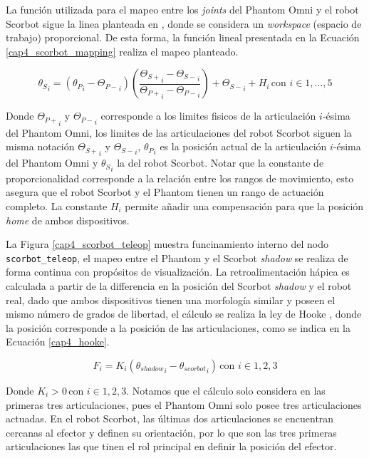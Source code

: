 La función utilizada para el mapeo entre los \textit{joints} del Phantom Omni y el robot Scorbot sigue la linea planteada en \cite{david}, donde se considera un \textit{workspace} (espacio de trabajo) proporcional. De esta forma, la función lineal presentada en la Ecuación \ref{cap4_scorbot_mapping} realiza el mapeo planteado.

\begin{equation}\label{cap4_scorbot_mapping}
{\theta_S}_{i} = ({\theta_P}_{i} - {\Theta_{P-}}_{i}) \left(  \frac{{\Theta_{S+}}_{i} - {\Theta_{S-}}_{i}}{{\Theta_{P+}}_{i} - {\Theta_{P-}}_{i}}   \right) + {\Theta_{S-}}_{i} + H_i \, \mbox{con } i \in {1, \dots, 5}
\end{equation}

Donde ${\Theta_{P+}}_i$ y ${\Theta_{P-}}_i$ corresponde a los limites fisicos de la articulación $i$-ésima del Phantom Omni, los limites de las articulaciones del robot Scorbot siguen la misma notación ${\Theta_{S+}}_i$ y ${\Theta_{S-}}_i$, ${\theta_P}_{i}$ es la posición actual de la articulación $i$-ésima del Phantom Omni y ${\theta_S}_{i}$ la del robot Scorbot. Notar que la constante de proporcionalidad corresponde a la relación entre los rangos de movimiento, esto asegura que el robot Scorbot y el Phantom tienen un rango de actuación completo. La constante $H_i$ permite añadir una compensación para que la posición \textit{home} de ambos dispositivos.

La Figura \ref{cap4_scorbot_teleop} muestra funcinamiento interno del nodo \texttt{scorbot\_teleop}, el mapeo entre el Phantom y el Scorbot \textit{shadow} se realiza de forma continua con propósitos de visualización. La retroalimentación hápica es calculada a partir de la differencia en la posición del Scorbot \textit{shadow} y el robot real, dado que ambos dispositivos tienen una morfología similar y poseen el mismo número de grados de libertad, el cálculo se realiza la ley de Hooke \cite{handbook}, donde la posición corresponde a la posición de las articulaciones, como se indica en la Ecuación \ref{cap4_hooke}.

\begin{equation}\label{cap4_hooke}
F_i = K_i({\theta_{shadow}}_i - {\theta_{scorbot}}_i) \, \mbox{con } i \in {1,2,3}
\end{equation}

Donde $K_i > 0 \, \mbox{con } i \in {1,2,3}$. Notamos que el cálculo solo considera en las primeras tres articulaciones, pues el Phantom Omni solo posee tres articulaciones actuadas. En el robot Scorbot, las últimas dos articulaciones se encuentran cercanas al efector y definen su orientación, por lo que son las tres primeras articulaciones las que tinen el rol principal en definir la posición del efector.

